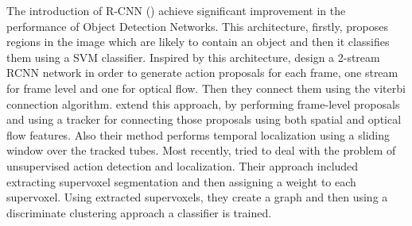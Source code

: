 \par

The introduction of R-CNN (\cite{DBLP:journals/corr/GirshickDDM13}) achieve significant improvement
in the performance of Object Detection Networks. This architecture, firstly, proposes regions in the image which are likely to
contain an object and then it classifies them using a SVM classifier. Inspired by this architecture, \cite{DBLP:journals/corr/GkioxariM14}
design a 2-stream RCNN network in order to generate action proposals for each frame, one stream for frame level and one for optical flow.
Then they  connect them using the viterbi connection algorithm. \cite{DBLP:journals/corr/WeinzaepfelHS15} extend this approach, by performing
frame-level proposals and using a tracker for connecting those proposals using both spatial and optical flow features. Also their method performs
temporal localization using a sliding window over the tracked tubes. Most recently, \cite{8237344} tried to deal with the problem of unsupervised
action detection and localization. Their approach included extracting supervoxel segmentation and then assigning a weight to each supervoxel.
Using extracted supervoxels, they create a graph and then using a discriminate clustering approach a classifier is trained.\par

